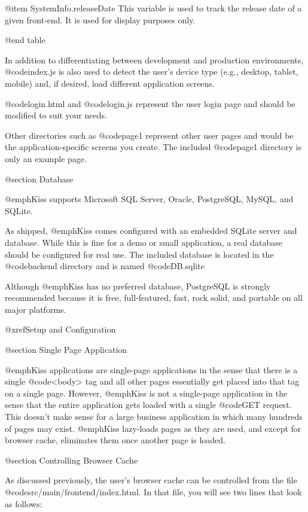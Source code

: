 @item SystemInfo.releaseDate 
This variable is used to track the release date of a given front-end.  It is used for display purposes only.

@end table

In addition to differentiating between development and production environments, @code{index.js}
is also used to detect the user's device type (e.g., desktop, tablet, mobile) and, if desired, 
load different application screens.


@code{login.html} and @code{login.js} represent the user login page
and should be modified to suit your needs.

Other directories such as @code{page1} represent other user pages and
would be the application-specific screens you create.  The included
@code{page1} directory is only an example page.

@section Database

@emph{Kiss} supports Microsoft SQL Server, Oracle, PostgreSQL, MySQL, and
SQLite.

As shipped, @emph{Kiss} comes configured with an embedded SQLite
server and database.  While this is fine for a demo or small
application, a real database should be configured for real use.
The included database is located in the @code{backend} directory
and is named @code{DB.sqlite}

Although @emph{Kiss} has no preferred database, PostgreSQL is strongly
recommended because it is free, full-featured, fast, rock solid, and
portable on all major platforms.

@xref{Setup and Configuration}


@section Single Page Application

@emph{Kiss} applications are single-page applications in the sense
that there is a single @code{<body>} tag and all other pages
essentially get placed into that tag on a single page.  However,
@emph{Kiss} is not a single-page application in the sense that the
entire application gets loaded with a single @code{GET} request.  This
doesn't make sense for a large business application in which many
hundreds of pages may exist.  @emph{Kiss} lazy-loads pages as they are
used, and except for browser cache, eliminates them once another page
is loaded.

@section Controlling Browser Cache

As discussed previously, the user's browser cache can be controlled from the file
@code{src/main/frontend/index.html}. In that file, you will see two lines
that look as follows:

